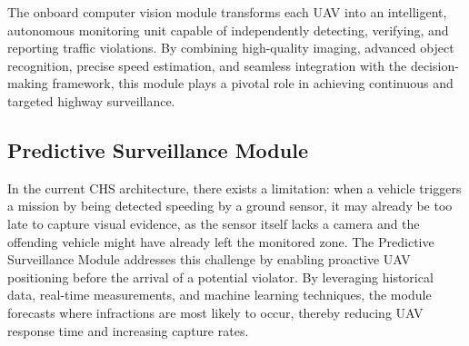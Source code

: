 The onboard computer vision module transforms each UAV into an intelligent, autonomous monitoring unit capable of independently detecting, verifying, and reporting traffic violations. By combining high-quality imaging, advanced object recognition, precise speed estimation, and seamless integration with the decision-making framework, this module plays a pivotal role in achieving continuous and targeted highway surveillance.



\subsection{Predictive Surveillance Module}

In the current CHS architecture, there exists a limitation: when a vehicle triggers a mission by being detected speeding by a ground sensor, it may already be too late to capture visual evidence, as the sensor itself lacks a camera and the offending vehicle might have already left the monitored zone. The Predictive Surveillance Module addresses this challenge by enabling proactive UAV positioning before the arrival of a potential violator. By leveraging historical data, real-time measurements, and machine learning techniques, the module forecasts where infractions are most likely to occur, thereby reducing UAV response time and increasing capture rates.

